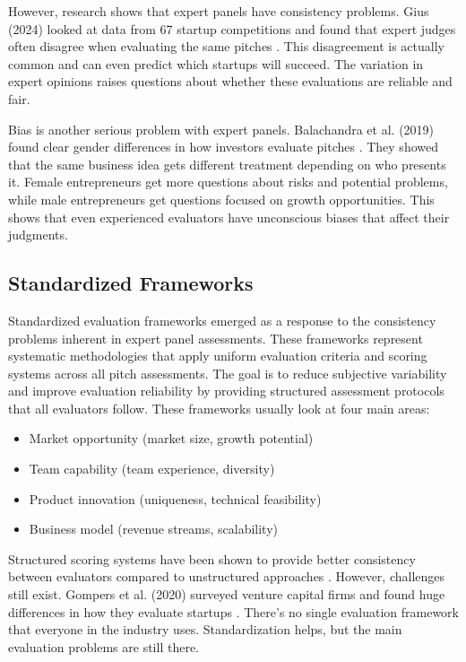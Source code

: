 However, research shows that expert panels have consistency problems. Gius (2024) looked at data from 67 startup competitions and found that expert judges often disagree when evaluating the same pitches \cite{Gius2024}. This disagreement is actually common and can even predict which startups will succeed. The variation in expert opinions raises questions about whether these evaluations are reliable and fair.

Bias is another serious problem with expert panels. Balachandra et al. (2019) found clear gender differences in how investors evaluate pitches \cite{Balachandra2019}. They showed that the same business idea gets different treatment depending on who presents it. Female entrepreneurs get more questions about risks and potential problems, while male entrepreneurs get questions focused on growth opportunities. This shows that even experienced evaluators have unconscious biases that affect their judgments.

\subsection{Standardized Frameworks}\label{subsec:standardized-frameworks}
Standardized evaluation frameworks emerged as a response to the consistency problems inherent in expert panel assessments. These frameworks represent systematic methodologies that apply uniform evaluation criteria and scoring systems across all pitch assessments. The goal is to reduce subjective variability and improve evaluation reliability by providing structured assessment protocols that all evaluators follow.
These frameworks usually look at four main areas:
\begin{itemize}
    \item Market opportunity (market size, growth potential)
    \item Team capability (team experience, diversity)
    \item Product innovation (uniqueness, technical feasibility)
    \item Business model (revenue streams, scalability)
\end{itemize}

Structured scoring systems have been shown to provide better consistency between evaluators compared to unstructured approaches \cite{Tsay2021VISUALSDI}. However, challenges still exist. Gompers et al. (2020) surveyed venture capital firms and found huge differences in how they evaluate startups \cite{Gompers2020}. There's no single evaluation framework that everyone in the industry uses. Standardization helps, but the main evaluation problems are still there.


